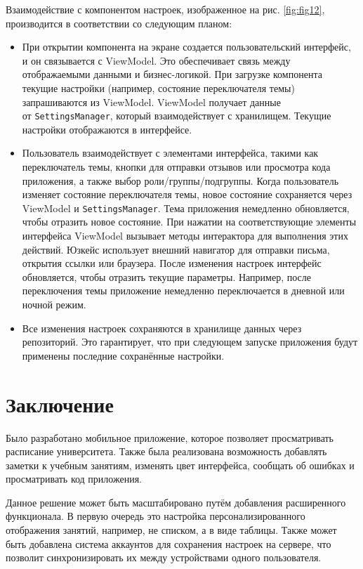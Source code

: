 \documentclass{vsureport}
\begin{document}
Взаимодействие с компонентом настроек, изображенное на рис. \ref{fig:fig12}, производится в соответствии со следующим планом:
\begin{itemize}
    \item При открытии компонента на экране создается пользовательский интерфейс, и он связывается с ViewModel. Это обеспечивает связь между отображаемыми данными и бизнес-логикой. При загрузке компонента текущие настройки (например, состояние переключателя темы) запрашиваются из ViewModel. ViewModel получает данные \\ от \texttt{SettingsManager}, который взаимодействует с хранилищем. Текущие настройки отображаются в интерфейсе.
    \item Пользователь взаимодействует с элементами интерфейса, такими как переключатель темы, кнопки для отправки отзывов или просмотра кода приложения, а также выбор роли/группы/подгруппы. Когда пользователь изменяет состояние переключателя темы, новое состояние сохраняется через ViewModel и \texttt{SettingsManager}. Тема приложения немедленно обновляется, чтобы отразить новое состояние. При нажатии на соответствующие элементы интерфейса ViewModel вызывает методы интерактора для выполнения этих действий. Юзкейс использует внешний навигатор для отправки письма, открытия ссылки или браузера. После изменения настроек интерфейс обновляется, чтобы отразить текущие параметры. Например, после переключения темы приложение немедленно переключается в дневной или ночной режим.
    \item Все изменения настроек сохраняются в хранилище данных через репозиторий. Это гарантирует, что при следующем запуске приложения будут применены последние сохранённые настройки.
\end{itemize}

\newpage
\section*{Заключение}

Было разработано мобильное приложение, которое позволяет просматривать расписание университета. Также была реализована возможность добавлять заметки к учебным занятиям, изменять цвет интерфейса, сообщать об ошибках и просматривать код приложения.

Данное решение может быть масштабировано путём добавления расширенного функционала. В первую очередь это настройка персонализированного отображения занятий, например, не списком, а в виде таблицы. Также может быть добавлена система аккаунтов для сохранения настроек на сервере, что позволит синхронизировать их между устройствами одного пользователя.
\end{document}
